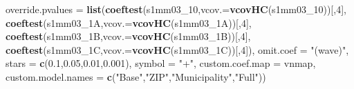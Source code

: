 \documentclass[
]{article}
\newenvironment{Shaded}{\begin{snugshade}}{\end{snugshade}}
\newcommand{\DataTypeTok}[1]{\textcolor[rgb]{0.13,0.29,0.53}{#1}}
\newcommand{\DecValTok}[1]{\textcolor[rgb]{0.00,0.00,0.81}{#1}}
\newcommand{\FloatTok}[1]{\textcolor[rgb]{0.00,0.00,0.81}{#1}}
\newcommand{\KeywordTok}[1]{\textcolor[rgb]{0.13,0.29,0.53}{\textbf{#1}}}
\newcommand{\NormalTok}[1]{#1}
\newcommand{\StringTok}[1]{\textcolor[rgb]{0.31,0.60,0.02}{#1}}
\begin{document}
\begin{Shaded}
\begin{Highlighting}[]
          \DataTypeTok{override.pvalues =} \KeywordTok{list}\NormalTok{(}\KeywordTok{coeftest}\NormalTok{(s1mm03_}\DecValTok{10}\NormalTok{,}\DataTypeTok{vcov.=}\KeywordTok{vcovHC}\NormalTok{(s1mm03_}\DecValTok{10}\NormalTok{))[,}\DecValTok{4}\NormalTok{],}
                                  \KeywordTok{coeftest}\NormalTok{(s1mm03_1A,}\DataTypeTok{vcov.=}\KeywordTok{vcovHC}\NormalTok{(s1mm03_1A))[,}\DecValTok{4}\NormalTok{],}
                                  \KeywordTok{coeftest}\NormalTok{(s1mm03_1B,}\DataTypeTok{vcov.=}\KeywordTok{vcovHC}\NormalTok{(s1mm03_1B))[,}\DecValTok{4}\NormalTok{],}
                                  \KeywordTok{coeftest}\NormalTok{(s1mm03_1C,}\DataTypeTok{vcov.=}\KeywordTok{vcovHC}\NormalTok{(s1mm03_1C))[,}\DecValTok{4}\NormalTok{]),}
          \DataTypeTok{omit.coef =} \StringTok{"(wave)"}\NormalTok{, }\DataTypeTok{stars =} \KeywordTok{c}\NormalTok{(}\FloatTok{0.1}\NormalTok{,}\FloatTok{0.05}\NormalTok{,}\FloatTok{0.01}\NormalTok{,}\FloatTok{0.001}\NormalTok{), }\DataTypeTok{symbol =} \StringTok{"+"}\NormalTok{,}
          \DataTypeTok{custom.coef.map =}\NormalTok{ vnmap, }
          \DataTypeTok{custom.model.names =} \KeywordTok{c}\NormalTok{(}\StringTok{"Base"}\NormalTok{,}\StringTok{"ZIP"}\NormalTok{,}\StringTok{"Municipality"}\NormalTok{,}\StringTok{"Full"}\NormalTok{))}
\end{Highlighting}
\end{Shaded}
\end{document}
